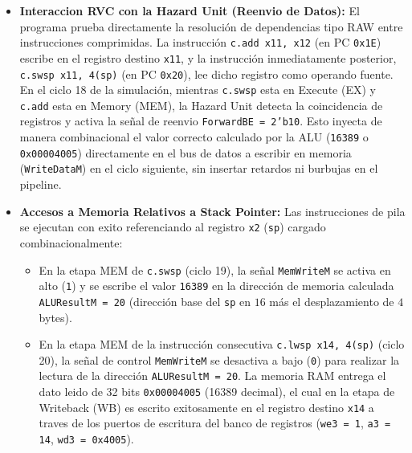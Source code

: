 \documentclass[12pt, a4paper]{article}
\begin{document}
\begin{itemize}
  \item \textbf{Interaccion RVC con la Hazard Unit (Reenvio de Datos):} 
    El programa prueba directamente la resolución de dependencias tipo RAW entre instrucciones comprimidas. La instrucción \texttt{c.add x11, x12} (en PC \texttt{0x1E}) escribe en el registro destino \texttt{x11}, y la instrucción inmediatamente posterior, \texttt{c.swsp x11, 4(sp)} (en PC \texttt{0x20}), lee dicho registro como operando fuente. En el ciclo 18 de la simulación, mientras \texttt{c.swsp} esta en Execute (EX) y \texttt{c.add} esta en Memory (MEM), la Hazard Unit detecta la coincidencia de registros y activa la señal de reenvio \texttt{ForwardBE = 2'b10}. Esto inyecta de manera combinacional el valor correcto calculado por la ALU (\texttt{16389} o \texttt{0x00004005}) directamente en el bus de datos a escribir en memoria (\texttt{WriteDataM}) en el ciclo siguiente, sin insertar retardos ni burbujas en el pipeline.
    
  \item \textbf{Accesos a Memoria Relativos a Stack Pointer:} 
    Las instrucciones de pila se ejecutan con exito referenciando al registro \texttt{x2} (\texttt{sp}) cargado combinacionalmente:
    \begin{itemize}
      \item En la etapa MEM de \texttt{c.swsp} (ciclo 19), la señal \texttt{MemWriteM} se activa en alto (\texttt{1}) y se escribe el valor \texttt{16389} en la dirección de memoria calculada \texttt{ALUResultM = 20} (dirección base del \texttt{sp} en $16$ más el desplazamiento de $4$ bytes).
      \item En la etapa MEM de la instrucción consecutiva \texttt{c.lwsp x14, 4(sp)} (ciclo 20), la señal de control \texttt{MemWriteM} se desactiva a bajo (\texttt{0}) para realizar la lectura de la dirección \texttt{ALUResultM = 20}. La memoria RAM entrega el dato leido de 32 bits \texttt{0x00004005} (16389 decimal), el cual en la etapa de Writeback (WB) es escrito exitosamente en el registro destino \texttt{x14} a traves de los puertos de escritura del banco de registros (\texttt{we3 = 1}, \texttt{a3 = 14}, \texttt{wd3 = 0x4005}).
    \end{itemize}


\end{itemize}
\end{document}
